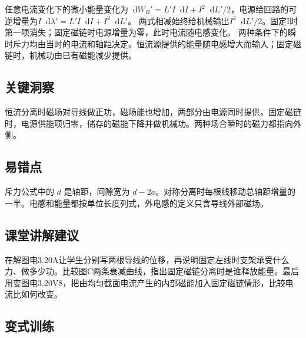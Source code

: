 \documentclass[UTF8,fontset=fandol,a4paper,11pt]{ctexart}
\newcommand{\dd}{\mathop{}\!\mathrm{d}}
\begin{document}
任意电流变化下的微小能量变化为$\dd W_B'=L'I\dd I+I^2\dd L'/2$，电源给回路的可逆增量为$I\dd\lambda'=L'I\dd I+I^2\dd L'$。
两式相减始终给机械输出$I^2\dd L'/2$。固定I时第一项消失；固定磁链时电源增量为零，此时电流随电感变化。
两种条件下的瞬时斥力均由当时的电流和轴距决定。恒流源提供的能量随电感增大而输入；固定磁链时，机械功由已有磁能减少提供。




\subsection*{关键洞察}

恒流分离时磁场对导线做正功，磁场能也增加，两部分由电源同时提供。固定磁链时，电源供能项归零，储存的磁能下降并做机械功。两种场合瞬时的磁力都指向外侧。



\subsection*{易错点}

斥力公式中的 $d$ 是轴距，间隙宽为 $d-2a$。对称分离时每根线移动总轴距增量的一半。电感和能量都按单位长度列式，外电感的定义只含导线外部磁场。



\subsection*{课堂讲解建议}

在解图电3.20A让学生分别写两根导线的位移，再说明固定左线时支架承受什么力、做多少功。比较图C两条衰减曲线，指出固定磁链分离时是谁释放能量。最后用变图电3.20V8，把由均匀截面电流产生的内部磁能加入固定磁链情形，比较电流比如何改变。


\subsection*{变式训练}
\end{document}
